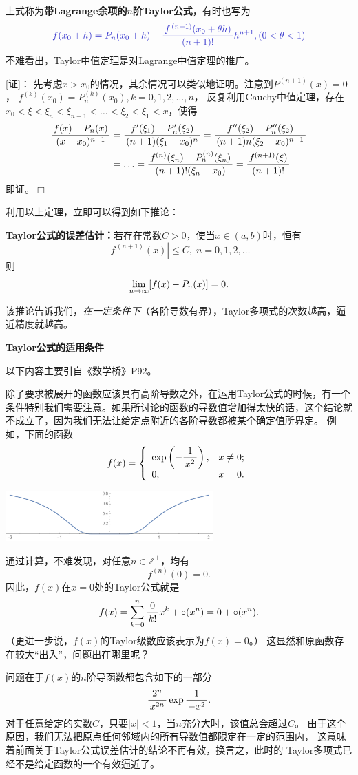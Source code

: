 上式称为{\bf 带Lagrange余项的$n$阶Taylor公式}，有时也写为
$${\b f(x_0+h)=P_n(x_0+h)+\df{f^{\,(n+1)}(x_0+\theta
h)}{(n+1)!}h^{n+1},(0<\theta<1)}$$
不难看出，Taylor中值定理是对Lagrange中值定理的推广。

[证]：
先考虑$x>x_0$的情况，其余情况可以类似地证明。注意到$P^{(n+1)}(x)=0$，
$f^{(k)}(x_0)=P^{(k)}_n(x_0),k=0,1,2,\ldots,n$，
反复利用Cauchy中值定理，存在$x_0<\xi<\xi_n<\xi_{n-1}
<\ldots<\xi_2<\xi_1<x$，使得
\begin{align}
	\displaystyle\frac{\,{f(x)-P_n(x)}\,}{\,{(x-x_0)^{n+1}}\,}
	&=\displaystyle\frac{\,{f'(\xi_1)-P'_n(\xi_2)}\,}{\,{(n+1)(\xi_1-x_0)^{n}}\,}
	=\displaystyle\frac{\,{f''(\xi_2)-P''_n(\xi_2)}\,}{\,{(n+1)n(\xi_2-x_0)^{n-1}}\,}\notag\\
	&=\ldots=\displaystyle\frac{\,{f^{(n)}(\xi_n)-P^{(n)}_n(\xi_n)}\,}{\,{(n+1)!(\xi_n-x_0)}\,}
	=\displaystyle\frac{\,{f^{(n+1)}(\xi)}\,}{\,{(n+1)!}\,}\notag
\end{align}
即证。\hfill$\Box$

利用以上定理，立即可以得到如下推论：
\begin{thx}
	{\bf Taylor公式的误差估计：}若存在常数$C>0$，使当$x\in(a,b)$时，恒有
	$$|f^{\,(n+1)}(x)|\leq C,\;n=0,1,2,\ldots$$
	则
	$$\lim\limits_{n\to\infty} [f(x)-P_n(x)]=0.$$
\end{thx}
该推论告诉我们，{\it 在一定条件下}（各阶导数有界），Taylor多项式的次数越高，逼近精度就越高。

\begin{shaded}
	{\bf Taylor公式的适用条件}
	
	以下内容主要引自《数学桥》P92。
	
	除了要求被展开的函数应该具有高阶导数之外，在运用Taylor公式的时候，有一个
	条件特别我们需要注意。如果所讨论的函数的导数值增加得太快的话，这个结论就
	不成立了，因为我们无法让给定点附近的各阶导数都被某个确定值所界定。
	例如，下面的函数
	$$f(x)=\left\{\begin{array}{ll}
		\exp\left(-\displaystyle\frac{\,{1}\,}{\,{x^2}\,}\right),&x\ne 0;\\
		0,& x=0.
	\end{array}\right.$$
	\begin{center}
		\includegraphics[width=0.6\textwidth]{./images/ch3/e-1x2.pdf}
	\end{center}
	通过计算，不难发现，对任意$n\in\mathbb{Z}^+$，均有
	$$f^{(n)}(0)=0.$$
	因此，$f(x)$在$x=0$处的Taylor公式就是
	$$f(x)=\sum\limits_{k=0}^n\displaystyle\frac{\,{0}\,}{\,{k!}\,}x^k+\circ(x^n)
	=0+\circ(x^n).$$
	（更进一步说，$f(x)$的Taylor级数应该表示为$f(x)=0$。）
	这显然和原函数存在较大“出入”，问题出在哪里呢？
	
	问题在于$f(x)$的$n$阶导函数都包含如下的一部分
	$$\displaystyle\frac{\,{2^n}\,}{\,{x^{2n}}\,}\exp\displaystyle\frac{\,{1}\,}{\,{-x^2}\,}.$$
	对于任意给定的实数$C$，只要$|x|<1$，当$n$充分大时，该值总会超过$C$。
	由于这个原因，我们无法把原点任何邻域内的所有导数值都限定在一定的范围内，
	这意味着前面关于Taylor公式误差估计的结论不再有效，换言之，此时的
	Taylor多项式已经不是给定函数的一个有效逼近了。
\end{shaded}

